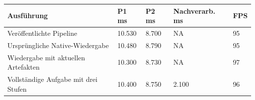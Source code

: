 \begin{tabular}{lllll}
\hline
Ausführung & P1 ms & P2 ms & Nachverarb. ms & FPS \\
\hline
Veröffentlichte Pipeline & 10.530 & 8.700 & NA & 95 \\
Ursprüngliche Native-Wiedergabe & 10.480 & 8.790 & NA & 95 \\
Wiedergabe mit aktuellen Artefakten & 10.300 & 8.730 & NA & 97 \\
Vollständige Aufgabe mit drei Stufen & 10.400 & 8.750 & 2.100 & 96 \\
\hline
\end{tabular}
